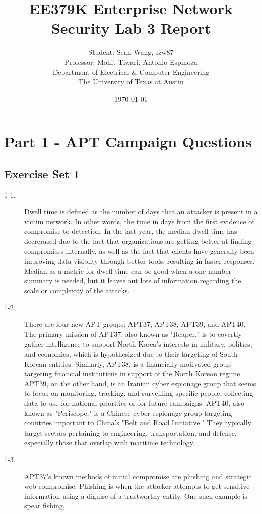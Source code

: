 \documentclass[11pt]{article}
\author{Student: Sean Wang, szw87 \\ Professor: Mohit Tiwari, Antonio Espinoza \\ Department of Electrical \& Computer Engineering \\ The University of Texas at Austin}
\date{\today}
\title{EE379K Enterprise Network Security Lab 3 Report}
\begin{document}
\maketitle
\section*{Part 1 - APT Campaign Questions}
\subsection*{Exercise Set 1}
\begin{description}
  \item[1-1.] Dwell time is defined as the number of days that an attacker is present in a victim network. In other words, the
    time in days from the first evidence of compromise to detection. In the last year, the median dwell time has decrerased
    due to the fact that organizations are getting better at finding compromises internally, as well as the fact that clients
    have generally been improving data visiblity through better tools, resulting in faster responses. Median as a metric for
    dwell time can be good when a one number summary is needed, but it leaves out lots of information regarding the scale or
    complexity of the attacks.
  \item[1-2.] There are four new APT groups: APT37, APT38, APT39, and APT40. The primary mission of APT37, also known as "Reaper,"
    is to covertly gather intelligence to support North Korea's interests in military, politics, and economics, which is hypothesized due to their targeting of
    South Korean entities. Similarly, APT38, is a financially motivated group targeting financial institutions in support of
    the North Korean regime. APT39, on the other hand, is an Iranian cyber espionage group that seems to focus on monitoring,
    tracking, and surveilling specific people, collecting data to use for national priorities or for future campaigns. APT40,
    also known as "Periscope," is a Chinese cyber espionage group targeting countries important to China's "Belt and Road
    Initiative." They typically target sectors pertaining to engineering, transportation, and defense, especially those that
    overlap with maritime technology.
  \item[1-3.] APT37's known methods of initial compromise are phishing and strategic web compromise. Phishing is when the
    attacker attempts to get sensitive information using a diguise of a trustworthy entity. One such example is spear fishing,

\end{description}
\end{document}
